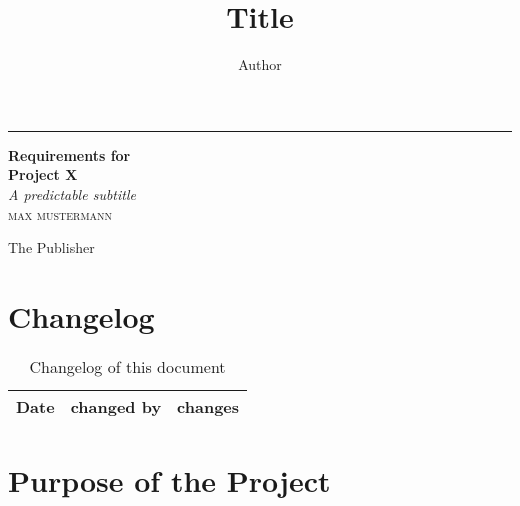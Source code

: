 \documentclass[a4paper, 12pt,twoside]{article}
\title{Title}
\author{Author}
\newcommand*{\plogo}{\fbox{$\mathcal{PL}$}}
\newcommand*{\pname}{Project X}
\begin{document}
\begin{titlepage} %
	
	\raggedleft %
	
	\rule{1pt}{\textheight} %
	\hspace{0.05\textwidth} %
	\parbox[b]{0.75\textwidth}{ %
		
		{\Huge\bfseries Requirements for \\[0.5\baselineskip] \pname}\\[2\baselineskip] %
		{\large\textit{A predictable subtitle}}\\[4\baselineskip] %
		{\Large\textsc{max mustermann}} %
		
		\vspace{0.5\textheight} %
		
		{\noindent The Publisher~~\plogo}\\[\baselineskip] %
	}
	
\end{titlepage}

\tableofcontents
\newpage

\begin{abstract}

\end{abstract}

\newpage
\section*{Changelog}
\begin{table}[t!h]
	\centering
	\begin{tabular}{|c|l|l|}
		\hline
		\textbf{Date} & \textbf{changed by} & \textbf{changes}\\\hline
	\end{tabular}
	\caption{Changelog of this document}
	\label{tab:changelog}
\end{table}

	
\newpage

\section{Purpose of the Project}
\end{document}
